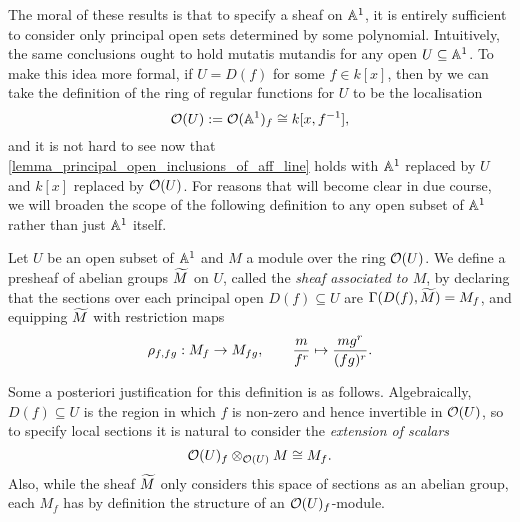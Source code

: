 The moral of these results is that to specify a sheaf on $\mathbb{A}^{{1}}$,
it is entirely sufficient to consider only principal open sets
determined by some polynomial.
Intuitively, the same conclusions ought to hold mutatis mutandis for
any open $U \subseteq \mathbb{A}^{{1}}$.
To make this idea more formal, if $U = D(f)$ for some $f \in k[x]$,
then by \cite[Proposition~6.3.5]{fulton} we can take the definition
of the ring of regular functions for $U$ to be the localisation
\[
  \mathcal{O}(U) := \mathcal{O}(\mathbb{A}^{{1}})_f \cong k[x, f^{-1}],
\]
and it is not hard to see now that
\cref{lemma_principal_open_inclusions_of_aff_line} holds with
$\mathbb{A}^{{1}}$ replaced by $U$ and $k[x]$ replaced by $\mathcal{O}(U)$.
For reasons that will become clear in due course, we will broaden the
scope of the following definition to any open subset of $\mathbb{A}^{{1}}$
rather than just $\mathbb{A}^{{1}}$ itself.

\begin{definition}
  \label{def_assmod}
  Let $U$ be an open subset of $\mathbb{A}^{{1}}$ and $M$ a module over the
  ring $\mathcal{O}(U)$.
  We define a presheaf of abelian groups $\widetilde{{M}}$ on $U$, called
  the \emph{sheaf associated to $M$}, by declaring that the sections
  over each principal open $D(f) \subseteq U$ are
  $\Gamma({D(f)}, {\widetilde{{M}}}) = M_f$, and equipping $\widetilde{{M}}$
  with restriction maps
  \[
    \rho_{{f}, {fg}}: M_f \to M_{fg},
    \qquad \frac{m}{f^r} \mapsto \frac{mg^r}{(fg)^r}.
  \]
\end{definition}

Some a posteriori justification for this definition is as follows.
Algebraically, $D(f) \subseteq U$ is the region in which $f$ is
non-zero and hence invertible in $\mathcal{O}(U)$, so to specify local
sections it is natural to consider the \emph{extension of scalars}
\[
  \mathcal{O}(U)_f \otimes_{\mathcal{O}(U)} M \cong M_f.
\]
Also, while the sheaf $\widetilde{{M}}$ only considers this space of
sections as an abelian group, each $M_f$ has by definition the
structure of an $\mathcal{O}(U)_f$-module.

